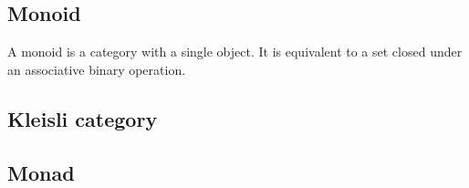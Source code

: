\documentclass{article}
\begin{document}
\subsection{Monoid}

A monoid is a category with a single object.
It is equivalent to a set closed under an associative binary operation. 

\subsection{Kleisli category}


\subsection{Monad}

\end{document}
